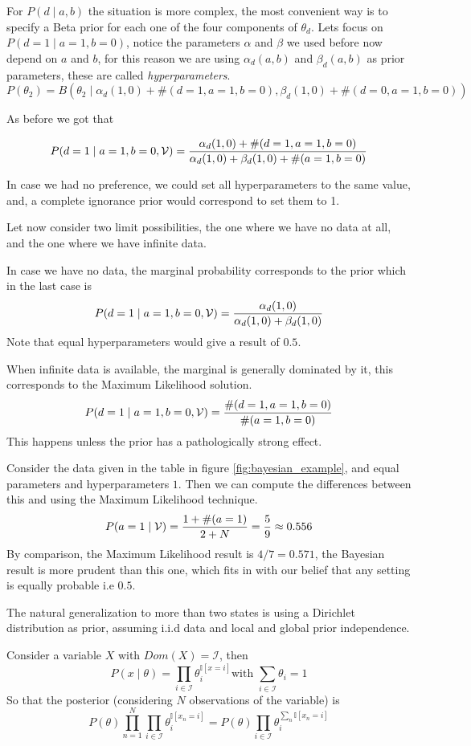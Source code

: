 For \(P(d \mid a ,b)\) the situation is more complex, the most convenient way is
to specify a Beta prior for each one of the four components of \(\theta_{d}\).
Lets focus on \(P(d = 1 \mid a = 1, b = 0)\), notice the parameters \(\alpha\)
and \(\beta\) we used before now depend on \(a\) and \(b\), for this reason we
are using \(\alpha_{d}(a,b)\) and \(\beta_{d}(a,b)\) as prior parameters, these
are called \emph{hyperparameters}.
\[
  P(\theta_{2}) = B(\theta_{2} \mid \alpha_{d}(1,0) + \#(d = 1, a = 1, b = 0), \beta_{d}(1,0) + \#(d = 0, a = 1, b = 0))
\]

As before we got that

\[
  P(d = 1 \mid a = 1, b = 0, \mathcal{V}) = \frac{\alpha_{d}(1,0) + \#(d = 1, a = 1, b = 0)}{\alpha_{d}(1,0) + \beta_{d}(1,0) + \#(a=1, b = 0)}
\]

In case we had no preference, we could set all hyperparameters to the same
value, and, a complete ignorance prior would correspond to set them to 1.

Let now consider two limit possibilities, the one where we have no data at all,
and the one where we have infinite data.

In case we have no data, the marginal probability corresponds to the prior which
in the last case is
\[
   P(d = 1 \mid a = 1, b = 0, \mathcal{V}) = \frac{\alpha_{d}(1,0)}{\alpha_{d}(1,0) + \beta_{d}(1,0)}
 \]
 Note that equal hyperparameters would give a result of \(0.5\).

 When infinite data is available, the marginal is generally dominated by it,
 this corresponds to the Maximum Likelihood solution.
 \[
   P(d = 1 \mid a = 1, b = 0, \mathcal{V}) = \frac{\#(d = 1, a = 1 , b = 0)}{\#(a = 1, b = 0)}
 \]
 This happens unless the prior has a pathologically strong effect.

 Consider the data given in the table in figure \ref{fig:bayesian_example}, and
 equal parameters and hyperparameters \(1\). Then we can compute the differences
 between this and using the Maximum Likelihood technique.
 \[
   P(a = 1 \mid \mathcal{V}) = \frac{1 + \#(a = 1)}{2 + N} = \frac{5}{9} \approx 0.556
 \]
 By comparison, the Maximum Likelihood result is \(4/7 = 0.571\), the Bayesian
 result is more prudent than this one, which fits in with our belief that any
 setting is equally probable i.e \(0.5\).


 The natural generalization to more than two states is using a Dirichlet
 distribution as prior, assuming i.i.d data and local and global prior independence.

 Consider a variable \(X\) with \(Dom(X) = \mathcal{I}\), then
 \[
   P(x \mid \theta) = \prod_{i \in \mathcal{I}}\theta_{i}^{\mathbb{I}[x = i]} \text{
   with  } \sum_{i \in \mathcal{I}}\theta_{i} = 1
\]
So that the posterior (considering \(N\) observations of the variable) is
\[
  P(\theta) \prod_{n = 1}^{N}\prod_{i \in \mathcal{I}}\theta_{i}^{\mathbb{I}[x_{n} = i]} = P(\theta) \prod_{i \in \mathcal{I}} \theta_{i}^{\sum_{n} \mathbb{I}[x_{n}=i]}
\]
